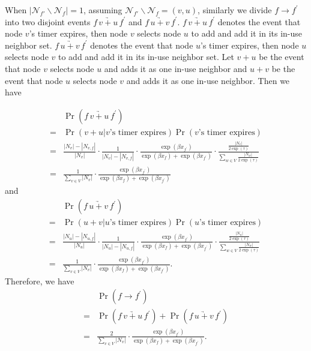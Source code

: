 \documentclass[10pt,conference]{IEEEtran}
\begin{document}
When $|\mathcal{N}_{f'}\backslash\mathcal{N}_{f}|=1$,
assuming $\mathcal{N}_{f'}\backslash\mathcal{N}_{f}=(v,u)$,
similarly we divide $f\rightarrow f^{'}$ into two disjoint events $f\,\underrightarrow{v+u}\, f^{'}$
and $f\,\underrightarrow{u+v}\, f^{'}$. $f\,\underrightarrow{v+u}\, f^{'}$
denotes the event that node $v$'s timer expires, then node $v$ selects
node $u$ to add and add it in its in-use neighbor set. $f\,\underrightarrow{u+v}\, f^{'}$
denotes the event that node $u$'s timer expires, then node $u$ selects
node $v$ to add and add it in its in-use neighbor set. Let $v+u$
be the event that node $v$ selects node $u$ and adds it as one in-use
neighbor and $u+v$ be the event that node $u$ selects node $v$
and adds it as one in-use neighbor. Then we have

\begin{align}
 & \Pr(f\,\underrightarrow{v+u}\, f^{'})\nonumber \\
= & \Pr(v+u|v\mbox{'s timer expires})\Pr(v\mbox{'s timer expires})\nonumber \\
= & \frac{|N_{v}|-|N_{v,f}|}{|N_{v}|}\cdot\frac{1}{|N_{v}|-|N_{v,f}|}\cdot\frac{\exp(\beta x_{f^{'}})}{\exp(\beta x_{f})+\exp(\beta x_{f^{'}})}\cdot\frac{\frac{|N_{v}|}{2\exp(\tau)}}{\sum_{w\in V}\frac{|N_{w}|}{2\exp(\tau)}}\nonumber \\
= & \frac{1}{\sum_{v\in V}|N_{v}|}\cdot\frac{\exp(\beta x_{f^{'}})}{\exp(\beta x_{f})+\exp(\beta x_{f^{'}})}
\end{align}
and
\begin{align}
 & \Pr(f\,\underrightarrow{u+v}\, f^{'})\nonumber \\
= & \Pr(u+v|u\mbox{'s timer expires})\Pr(u\mbox{'s timer expires})\nonumber \\
= & \frac{|N_{u}|-|N_{u,f}|}{|N_{u}|}\cdot\frac{1}{|N_{u}|-|N_{u,f}|}\cdot\frac{\exp(\beta x_{f^{'}})}{\exp(\beta x_{f})+\exp(\beta x_{f^{'}})}\cdot\frac{\frac{|N_{u}|}{2\exp(\tau)}}{\sum_{w\in V}\frac{|N_{w}|}{2\exp(\tau)}}\nonumber \\
= & \frac{1}{\sum_{v\in V}|N_{v}|}\cdot\frac{\exp(\beta x_{f^{'}})}{\exp(\beta x_{f})+\exp(\beta x_{f^{'}})}.
\end{align}
Therefore, we have
\begin{align}
 & \Pr(f\rightarrow f^{'})\nonumber \\
= & \Pr(f\,\underrightarrow{v+u}\, f^{'})+\Pr(f\,\underrightarrow{u+v}\, f^{'})\nonumber \\
= & \frac{2}{\sum_{v\in V}|N_{v}|}\cdot\frac{\exp(\beta x_{f^{'}})}{\exp(\beta x_{f})+\exp(\beta x_{f^{'}})}.
\end{align}
\end{document}
